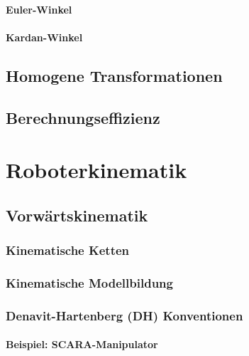 \documentclass[a4paper, 11pt, accentcolor = tud3b]{tudreport}
\begin{document}
				\subsubsection{Euler-Winkel} %

				\subsubsection{Kardan-Winkel} %

		\section{Homogene Transformationen} %

		\section{Berechnungseffizienz} %

	\chapter{Roboterkinematik} %

		\section{Vorwärtskinematik} %

			\subsection{Kinematische Ketten} %

			\subsection{Kinematische Modellbildung} %

			\subsection{Denavit-Hartenberg (DH) Konventionen} %

				\subsubsection{Beispiel: SCARA-Manipulator} %
\end{document}

